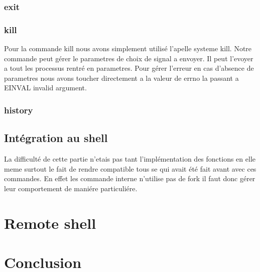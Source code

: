 \documentclass[12pt]{article}
\begin{document}
 \subsubsection{exit}
 
 \subsubsection{kill}
 Pour la commande kill nous avons simplement utilisé l'apelle systeme kill. Notre commande
 peut gérer le parametres de choix de signal a envoyer. Il peut l'evoyer a tout les processus
 rentré en parametres.
 Pour gérer l'erreur en cas d'absence de parametres nous avons toucher directement a la valeur
 de errno la passant a EINVAL invalid argument.
 
 \subsubsection{history}
 
 \subsection{Intégration au shell}
 
 La difficulté de cette partie n'etais pas tant l'implémentation des fonctions en elle meme
 surtout le fait de rendre compatible tous se qui avait été fait avant avec ces commandes.
 En effet les commande interne n'utilise pas de fork il faut donc gérer leur comportement
 de maniére particuliére.

\newpage
\section{Remote shell}


\newpage
\section{Conclusion}
\end{document}
